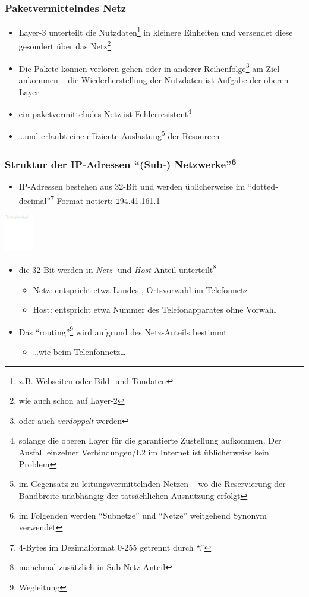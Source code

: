\documentclass{beamer}
\begin{document}
\begin{frame}
\frametitle{Paketvermittelndes Netz}
\begin{itemize}
	\item{Layer-3 unterteilt die Nutzdaten\footnote{z.B. Webseiten oder Bild- und Tondaten} in kleinere Einheiten und versendet diese gesondert \"uber das Netz\footnote{wie auch schon auf Layer-2}}
	\item{Die Pakete k\"onnen verloren gehen oder in anderer Reihenfolge\footnote{oder auch {\em verdoppelt} werden} am Ziel ankommen -- die Wiederherstellung der Nutzdaten ist Aufgabe der oberen Layer}
	\item{ein paketvermittelndes Netz ist Fehlerresistent\footnote{solange die oberen Layer f\"ur die garantierte Zustellung aufkommen. Der Ausfall einzelner Verbindungen/L2 im Internet ist \"ublicherweise kein Problem}}
	\item{\ldots und erlaubt eine effiziente Auslastung\footnote{im Gegensatz zu leitungsvermittelnden Netzen -- wo die Reservierung der Bandbreite unabh\"angig der tats\"achlichen Ausnutzung erfolgt} der Resourcen}
\end{itemize}
\end{frame}


\begin{frame}
\frametitle{Struktur der IP-Adressen ``(Sub-) Netzwerke''\footnote{im Folgenden werden ``Subnetze'' und ``Netze'' weitgehend Synonym verwendet}}
\begin{itemize}
	\item{IP-Adressen bestehen aus 32-Bit und werden \"ublicherweise im ``dotted-decimal''\footnote{4-Bytes im Dezimalformat 0-255 getrennt durch ``.''} Format notiert: {\texttt 194.41.161.1}}
\end{itemize}
  {\center \includegraphics[height=1.6cm]{ip-address}}
\begin{itemize}
	\item{die 32-Bit werden in {\em Netz-} und {\em Host-}Anteil unterteilt\footnote{manchmal zus\"atzlich in Sub-Netz-Anteil}}
	\begin{itemize}
	\item{{\tiny Netz: entspricht etwa Landes-, Ortsvorwahl im Telefonnetz}}
	\item{{\tiny Host: entspricht etwa Nummer des Telefonapparates ohne Vorwahl}}
  \end{itemize}
  \item{Das ``routing''\footnote{Wegleitung} wird aufgrund des Netz-Anteils bestimmt}
  \begin{itemize}
	\item{{\tiny \ldots wie beim Telenfonnetz\ldots}}
\end{itemize}
	\end{itemize}
\end{frame}
\end{document}
